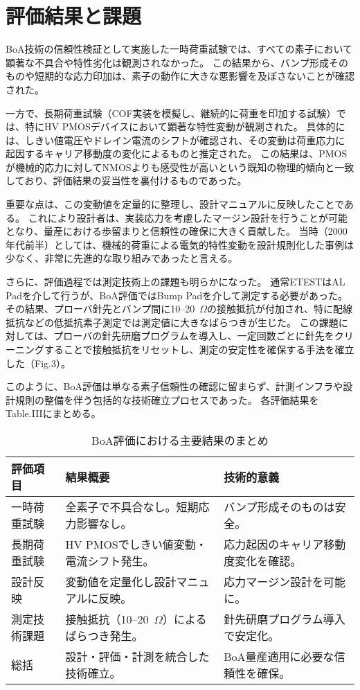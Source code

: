\documentclass[conference]{IEEEtran}
\begin{document}
\section{評価結果と課題}
BoA技術の信頼性検証として実施した一時荷重試験では、すべての素子において顕著な不具合や特性劣化は観測されなかった。  
この結果から、バンプ形成そのものや短期的な応力印加は、素子の動作に大きな悪影響を及ぼさないことが確認された。  

一方で、長期荷重試験（COF実装を模擬し、継続的に荷重を印加する試験）では、特にHV PMOSデバイスにおいて顕著な特性変動が観測された。  
具体的には、しきい値電圧やドレイン電流のシフトが確認され、その変動は荷重応力に起因するキャリア移動度の変化によるものと推定された。  
この結果は、PMOSが機械的応力に対してNMOSよりも感受性が高いという既知の物理的傾向と一致しており、評価結果の妥当性を裏付けるものであった。  

重要な点は、この変動値を定量的に整理し、設計マニュアルに反映したことである。  
これにより設計者は、実装応力を考慮したマージン設計を行うことが可能となり、量産における歩留まりと信頼性の確保に大きく貢献した。  
当時（2000年代前半）としては、機械的荷重による電気的特性変動を設計規則化した事例は少なく、非常に先進的な取り組みであったと言える。  

さらに、評価過程では測定技術上の課題も明らかになった。  
通常ETESTはAL Padを介して行うが、BoA評価ではBump Padを介して測定する必要があった。  
その結果、プローバ針先とバンプ間に10--20~$\Omega$の接触抵抗が付加され、特に配線抵抗などの低抵抗素子測定では測定値に大きなばらつきが生じた。  
この課題に対しては、プローバの針先研磨プログラムを導入し、一定回数ごとに針先をクリーニングすることで接触抵抗をリセットし、測定の安定性を確保する手法を確立した（Fig.3）。  

このように、BoA評価は単なる素子信頼性の確認に留まらず、計測インフラや設計規則の整備を伴う包括的な技術確立プロセスであった。  
各評価結果をTable.IIIにまとめる。

\begin{table}[t]
\centering
\caption{BoA評価における主要結果のまとめ}
\label{tab:boa_results}
\begin{tabular}{|p{2.0cm}|p{3.0cm}|p{3.0cm}|}
\hline
\textbf{評価項目} & \textbf{結果概要} & \textbf{技術的意義} \\
\hline
一時荷重試験 & 全素子で不具合なし。短期応力影響なし。 & バンプ形成そのものは安全。 \\
\hline
長期荷重試験 & HV PMOSでしきい値変動・電流シフト発生。 & 応力起因のキャリア移動度変化を確認。\\
\hline
設計反映 & 変動値を定量化し設計マニュアルに反映。 & 応力マージン設計を可能に。\\
\hline
測定技術課題 & 接触抵抗（10--20~$\Omega$）によるばらつき発生。 & 針先研磨プログラム導入で安定化。\\
\hline
総括 & 設計・評価・計測を統合した技術確立。 & BoA量産適用に必要な信頼性を確保。\\
\hline
\end{tabular}
\end{table}
\end{document}
